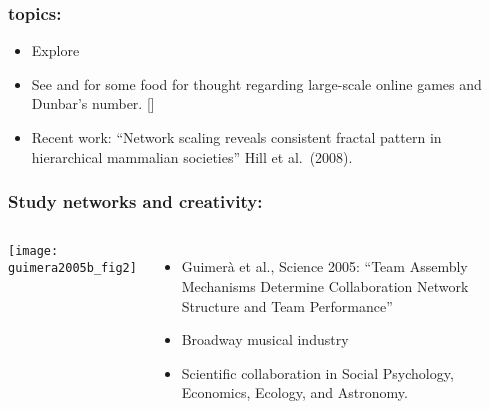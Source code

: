   \begin{frame}
    \frametitle{topics:}

    \begin{block}{}
      \begin{itemize}
      \item 
        Explore 
      \item
        See
        and 
        for some food for thought regarding large-scale online games and Dunbar's number.
        []
      \item 
        Recent work:
        ``Network scaling reveals consistent fractal pattern in hierarchical mammalian societies''
        Hill et al.\ (2008)\cite{hill2008a}.
      \end{itemize}
    \end{block}

  \end{frame}

\begin{frame}
  \frametitle{Study networks and creativity:}

  \begin{columns}
    \texttt{[image: guimera2005b\_fig2]}
    \begin{itemize}
    \item
      Guimer\`{a} et al., Science 2005:\cite{guimera2005b}
      ``Team Assembly Mechanisms Determine Collaboration Network Structure and Team Performance''
    \item 
      Broadway musical industry
    \item 
      Scientific collaboration in Social Psychology, Economics, Ecology, and Astronomy.
    \end{itemize}
  \end{columns}

\end{frame}


